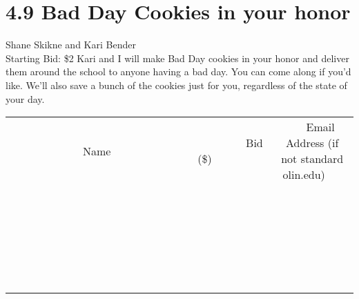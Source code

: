 \documentclass[11pt]{article}
\begin{document}
\section*{4.9 Bad Day Cookies in your honor}
Shane Skikne and Kari Bender
\\
Starting Bid: \$2
\newline
Kari and I will make Bad Day cookies in your honor and deliver them around the school to anyone having a bad day. You can come along if you'd like. We'll also save a bunch of the cookies just for you, regardless of the state of your day.
\\[6ex]
\begin{tabular}{c c c}
~~~~~~~~~~~~~Name~~~~~~~~~~~~~ & ~~~~~~~~~Bid (\$)~~~~~~~~~  & ~~~Email Address (if not standard olin.edu)~~~\\
 & & \\
\hline
 & & \\
\hline
 & & \\
\hline
 & & \\
\hline
 & & \\
\hline
 & & \\
\hline
 & & \\
\hline
 & & \\
\hline
 & & \\
\hline
 & & \\
\hline
 & & \\
\hline
 & & \\
\hline
 & & \\
\hline
 & & \\
\hline
 & & \\
\hline
 & & \\
\hline
 & & \\
\hline
 & & \\
\hline
 & & \\
\hline
 & & \\
\hline
 & & \\
\hline
 & & \\
\hline
 & & \\
\hline
 & & \\
\hline
 & & \\
\hline
 & & \\
\hline
\end{tabular}
\newpage
\end{document}
